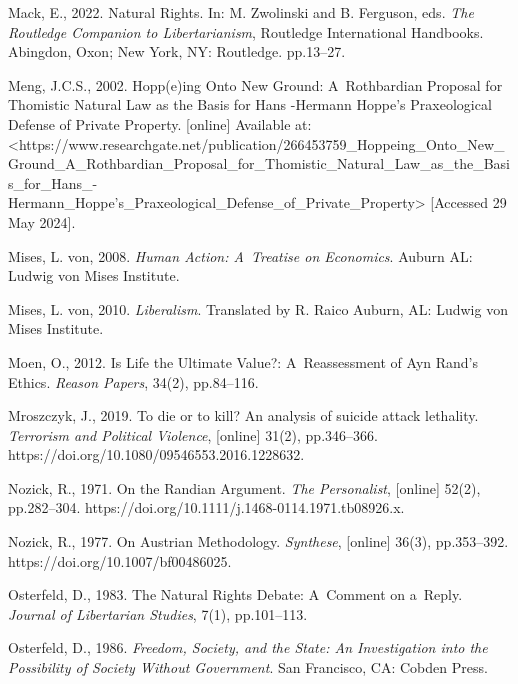 Mack, E., 2022. Natural Rights. In: M. Zwolinski and B. Ferguson, eds. \textit{The Routledge Companion to Libertarianism}, Routledge International Handbooks. Abingdon, Oxon; New York, NY: Routledge. pp.13–27.



Meng, J.C.S., 2002. Hopp(e)ing Onto New Ground: A~Rothbardian Proposal for Thomistic Natural Law as the Basis for Hans -Hermann Hoppe's Praxeological Defense of Private Property. [online] Available at: {\textless}https://www.researchgate.net/publication/266453759\_Hoppeing\_Onto\_New\_Ground\_A\_Rothbardian\_Proposal\_for\_Thomistic\_Natural\_Law\_as\_the\_Basis\_for\_Hans\_-Hermann\_Hoppe's\_Praxeological\_Defense\_of\_Private\_Property{\textgreater} [Accessed 29 May 2024].



Mises, L. von, 2008. \textit{Human Action: A~Treatise on Economics}. Auburn AL: Ludwig von Mises Institute.



Mises, L. von, 2010. \textit{Liberalism}. Translated by R. Raico Auburn, AL: Ludwig von Mises Institute.



Moen, O., 2012. Is Life the Ultimate Value?: A~Reassessment of Ayn Rand's Ethics. \textit{Reason Papers}, 34(2), pp.84–116.



Mroszczyk, J., 2019. To die or to kill? An analysis of suicide attack lethality. \textit{Terrorism and Political Violence}, [online] 31(2), pp.346–366. https://doi.org/10.1080/09546553.2016.1228632.



Nozick, R., 1971. On the Randian Argument. \textit{The Personalist}, [online] 52(2), pp.282–304. https://doi.org/10.1111/j.1468-0114.1971.tb08926.x.



Nozick, R., 1977. On Austrian Methodology. \textit{Synthese}, [online] 36(3), pp.353–392. https://doi.org/10.1007/bf00486025.



Osterfeld, D., 1983. The Natural Rights Debate: A~Comment on a~Reply. \textit{Journal of Libertarian Studies}, 7(1), pp.101–113.



Osterfeld, D., 1986. \textit{Freedom, Society, and the State: An Investigation into the Possibility of Society Without Government}. San Francisco, CA: Cobden Press.



